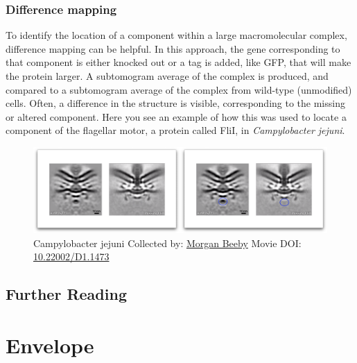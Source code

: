 \documentclass[]{tufte-book}
\begin{document}
\hypertarget{Difference_mapping}{\subsection{Difference
mapping}\label{Difference_mapping}}

To identify the location of a component within a large macromolecular
complex, difference mapping can be helpful. In this approach, the gene
corresponding to that component is either knocked out or a tag is added,
like GFP, that will make the protein larger. A subtomogram average of
the complex is produced, and compared to a subtomogram average of the
complex from wild-type (unmodified) cells. Often, a difference in the
structure is visible, corresponding to the missing or altered component.
Here you see an example of how this was used to locate a component of
the flagellar motor, a protein called FliI, in \emph{Campylobacter
jejuni}.





\begin{figure}
\includegraphics{movie_stills/1_10a} \caption[Campylobacter jejuni Collected by:
\protect\hyperlink{morgan_beeby}{Morgan Beeby} Movie DOI:
\href{https://doi.org/10.22002/D1.1473}{10.22002/D1.1473}]{Campylobacter jejuni Collected by:
\protect\hyperlink{morgan_beeby}{Morgan Beeby} Movie DOI:
\href{https://doi.org/10.22002/D1.1473}{10.22002/D1.1473}}\label{fig:1-10a}
\end{figure}

\section{Further Reading}\label{further-reading}

\citep{chalfie1994}

\citep{jensen}

\citep{oikonomou2017}

\citep{ruska1987}

\chapter{Envelope}\label{envelope}
\end{document}
